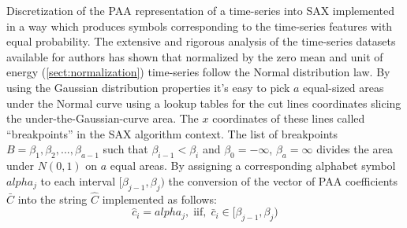 Discretization of the PAA representation of a time-series into SAX implemented in a way which produces symbols corresponding to the time-series features with equal probability. The extensive and rigorous analysis of the time-series datasets available for authors has shown that normalized by the zero mean and unit of energy (\ref{sect:normalization}) time-series follow the Normal distribution law. By using the Gaussian distribution properties it's easy to pick $a$ equal-sized areas under the Normal curve using a lookup tables  \cite{citeulike:167581} for the cut lines coordinates slicing the under-the-Gaussian-curve area. 
The $x$ coordinates of these lines called ``breakpoints'' in the SAX algorithm context. The list of breakpoints $B=\beta_{1}, \beta_{2}, ... , \beta_{a-1}$ such that $\beta_{i-1} < \beta_{i}$ and $\beta_{0} = -\infty$, $\beta_{a} = \infty$ divides the area under $N(0,1)$ on $a$ equal areas. By assigning a corresponding alphabet symbol $alpha_{j}$ to each interval $[\beta_{j-1},\beta_{j})$ the conversion of the vector of PAA coefficients $\bar{C}$ into the string $\hat{C}$ implemented as follows:
\begin{equation}
\hat{c}_{i} = alpha_{j}, \; \text{iif}, \; \bar{c}_{i} \in [\beta_{j-1},\beta_{j})
\label{eq:alpha}
\end{equation}

